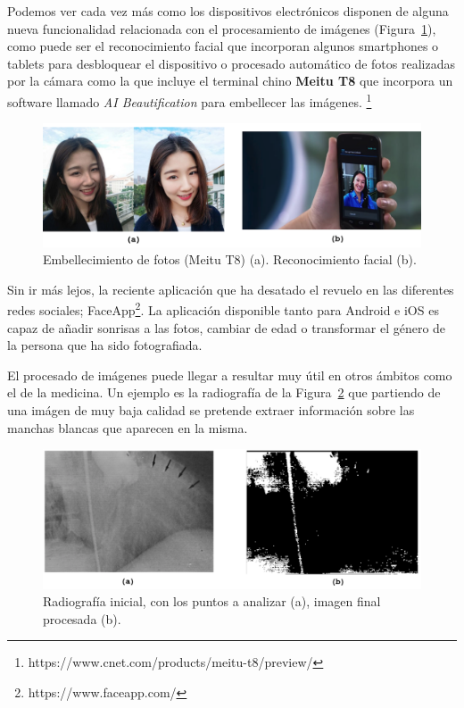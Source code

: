 Podemos ver cada vez más como los dispositivos electrónicos disponen de alguna nueva funcionalidad relacionada con el procesamiento de imágenes (Figura~\ref{fig:Face}), como puede ser el reconocimiento facial que incorporan algunos smartphones o tablets para desbloquear el dispositivo o procesado automático de fotos realizadas por la cámara como la que incluye el terminal chino \textbf{Meitu T8} que incorpora un software llamado \textit{AI Beautification} para embellecer las imágenes. \footnote{https://www.cnet.com/products/meitu-t8/preview/}

\begin{figure}[th]
\centering
\includegraphics[scale=0.43]{Figures/face.png}
\decoRule
\caption[Face]{Embellecimiento de fotos (Meitu T8) (a). Reconocimiento facial (b).}
\label{fig:Face}
\end{figure}

Sin ir más lejos, la reciente aplicación que ha desatado el revuelo en las diferentes redes sociales; FaceApp\footnote{https://www.faceapp.com/}. La aplicación disponible tanto para Android e iOS es capaz de añadir sonrisas a las fotos, cambiar de edad o transformar el género de la persona que ha sido fotografiada.

El procesado de imágenes puede llegar a resultar muy útil en otros ámbitos como el de la medicina. Un ejemplo es la radiografía de la Figura~\ref{fig:Medicine} que partiendo de una imágen de muy baja calidad se  pretende  extraer  información  sobre  las  manchas
blancas que aparecen en la misma.

\begin{figure}[th]
\centering
\includegraphics[scale=0.4]{Figures/medicine.png}
\decoRule
\caption[Medicine]{Radiografía inicial, con los puntos a analizar (a), imagen final procesada (b).}
\label{fig:Medicine}
\end{figure}

